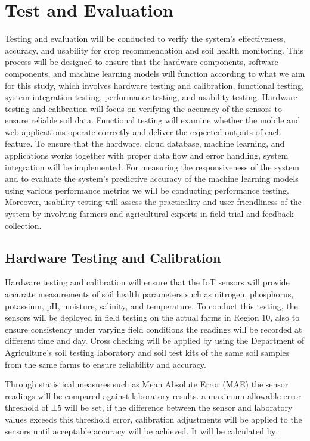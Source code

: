 {	\section{Test and Evaluation}
	Testing and evaluation will be conducted to verify the system’s effectiveness, accuracy, and usability for crop recommendation and soil health monitoring. This process will be designed to ensure that the hardware components, software components, and machine learning models will function according to what we aim for this study, which involves hardware testing and calibration, functional testing, system integration testing, performance testing, and usability testing. Hardware testing and calibration will focus on verifying the accuracy of the sensors to ensure reliable soil data. Functional testing will examine whether the mobile and web applications operate correctly and deliver the expected outputs of each feature. To ensure that the hardware, cloud database, machine learning, and applications works together with proper data flow and error handling, system integration will be implemented. For measuring the responsiveness of the system and to evaluate the system’s predictive accuracy of the machine learning models using various performance metrics we will be conducting performance testing. Moreover, usability testing will assess the practicality and user-friendliness of the system by involving farmers and agricultural experts in field trial and feedback collection.
	
	\subsection{Hardware Testing and Calibration}
	Hardware testing and calibration will ensure that the IoT sensors will provide accurate measurements of soil health parameters such as nitrogen, phosphorus, potassium, pH, moisture, salinity, and temperature. To conduct this testing, the sensors will be deployed in field testing on the actual farms in Region 10, also to ensure consistency under varying field conditions the readings will be recorded at different time and day. Cross checking will be applied by using the Department of Agriculture’s soil testing laboratory and soil test kits of the same soil samples from the same farms to ensure reliability and accuracy.
	
	Through statistical measures such as Mean Absolute Error (MAE) the sensor readings will be compared against laboratory results. a maximum allowable error threshold of ±5 will be set, if the difference between the sensor and laboratory values exceeds this threshold error, calibration adjustments will be applied to the sensors until acceptable accuracy will be achieved. It will be calculated by:
	
}
